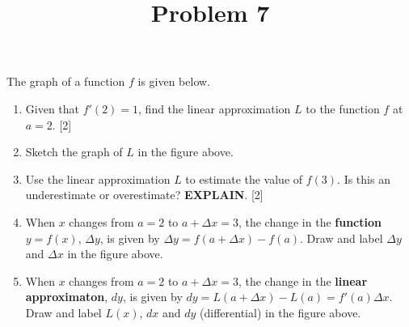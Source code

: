 \documentclass{ximera}
\title[Problem 7]{Problem 7}
\begin{document}
\begin{abstract} \end{abstract}
\maketitle

\begin{problem}
The graph of a function $f$ is given below.
    	  \begin{center}
	\end{center}
\begin{enumerate}
\item Given that $f'(2)=1$, find the linear approximation $L$ to the function $f$ at $a=2$.
	[2]

\item Sketch the graph of $L$ in the figure above.

\item Use the linear approximation $L$ to estimate the value of $f(3)$.  Is this an underestimate or overestimate?  \textbf{EXPLAIN}.
	[2]

\item When $x$ changes from $a=2$ to $a+\Delta x=3$, the change in the {\bf function} $y=f(x)$, $\Delta y$, is given by $\Delta y=f(a+ \Delta x)-f(a)$.  Draw and label $\Delta y$ and $\Delta x$ in the figure above.

\item When $x$ changes from $a=2$ to $a+ \Delta x=3$, the change in the {\bf linear approximaton}, $dy$, is given by $dy=L(a+\Delta x)-L(a)=f'(a)\Delta x$.  Draw and label $L(x)$, $dx$ and $dy$ (differential) in the figure above.

\end{enumerate}
\end{problem}
\end{document}
